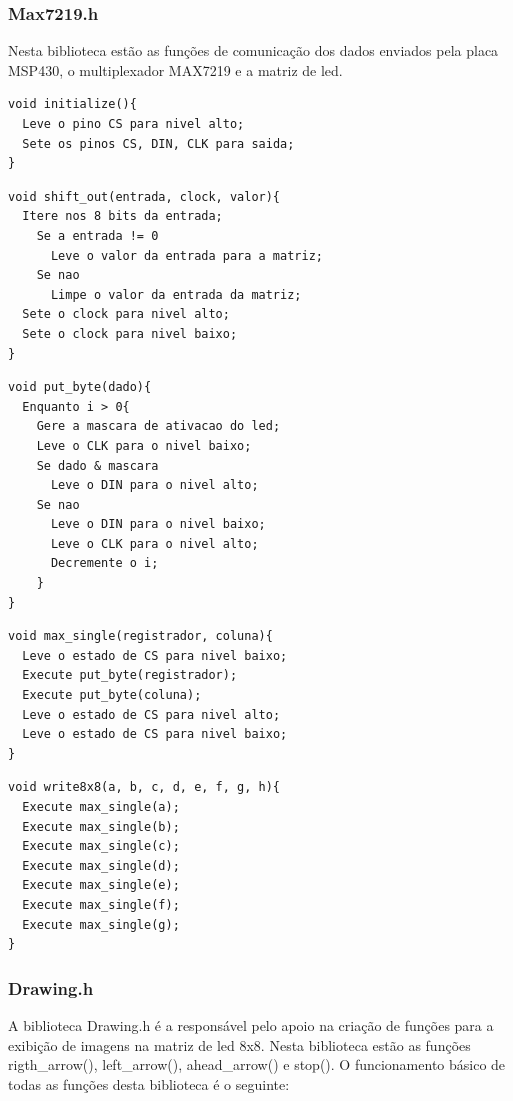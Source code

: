 \documentclass[conference]{IEEEtran}
\begin{document}
\subsubsection{Max7219.h}
Nesta biblioteca estão as funções de comunicação dos dados enviados pela placa MSP430, o multiplexador MAX7219 e a matriz de led.
\begin{lstlisting}
void initialize(){
  Leve o pino CS para nivel alto;
  Sete os pinos CS, DIN, CLK para saida;
}
\end{lstlisting}

\begin{lstlisting}
void shift_out(entrada, clock, valor){
  Itere nos 8 bits da entrada;
    Se a entrada != 0
      Leve o valor da entrada para a matriz;
    Se nao
      Limpe o valor da entrada da matriz;
  Sete o clock para nivel alto;
  Sete o clock para nivel baixo; 
}
\end{lstlisting}

\begin{lstlisting}
void put_byte(dado){
  Enquanto i > 0{
	Gere a mascara de ativacao do led;
	Leve o CLK para o nivel baixo;
	Se dado & mascara
	  Leve o DIN para o nivel alto;
	Se nao
	  Leve o DIN para o nivel baixo;
	  Leve o CLK para o nivel alto;
	  Decremente o i;	
	}
}
\end{lstlisting}

\begin{lstlisting}
void max_single(registrador, coluna){
  Leve o estado de CS para nivel baixo;
  Execute put_byte(registrador);
  Execute put_byte(coluna);
  Leve o estado de CS para nivel alto;
  Leve o estado de CS para nivel baixo;
}
\end{lstlisting}

\begin{lstlisting}
void write8x8(a, b, c, d, e, f, g, h){
  Execute max_single(a);
  Execute max_single(b);
  Execute max_single(c);
  Execute max_single(d);
  Execute max_single(e);
  Execute max_single(f);
  Execute max_single(g);
}
\end{lstlisting}

\subsubsection{Drawing.h}
A biblioteca Drawing.h é a responsável pelo apoio na criação de funções para a exibição de imagens na matriz de led 8x8. Nesta biblioteca estão as funções rigth\_arrow(), left\_arrow(), ahead\_arrow() e stop(). O funcionamento básico de todas as funções desta biblioteca é o seguinte:
\end{document}
